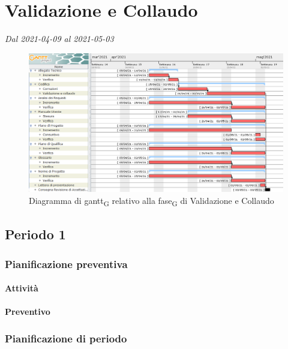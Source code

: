 \section{Validazione e Collaudo}
\textit{Dal 2021-04-09 al 2021-05-03}


\begin{figure}[H]
	\centering
	\includegraphics[scale=0.51]{res/images/06_gantt_validazione}
	\caption{Diagramma di gantt\textsubscript{G} relativo alla fase\textsubscript{G} di Validazione e Collaudo}
\end{figure}


\subsection{Periodo 1}

\subsubsection{Pianificazione preventiva}

\paragraph{Attività}

\planningTable{
	
}

\paragraph{Preventivo}


\subsubsection{Pianificazione di periodo}


